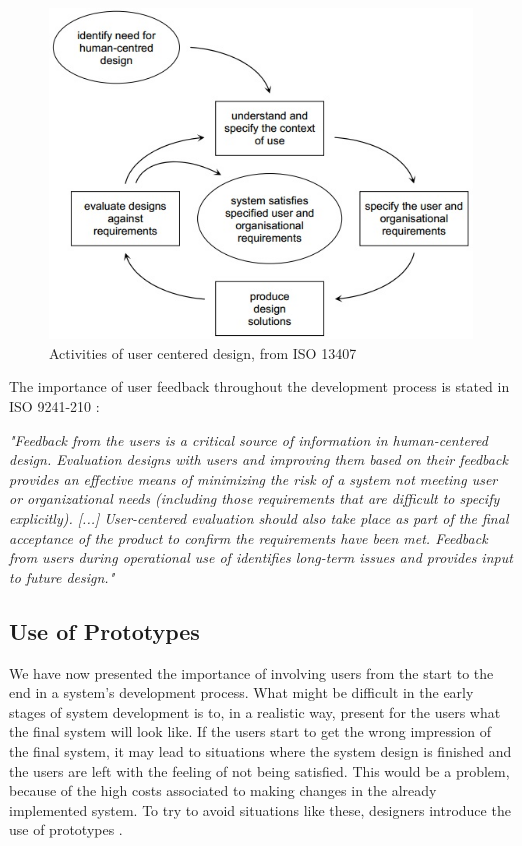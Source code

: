 \begin{figure} [H]
\centering
\includegraphics[scale=0.7]{userCenteredDesign.jpg}
\caption[User centered design]{Activities of user centered design, from ISO 13407 \cite{jokela2003standard}}
\label{userdesign}
\end{figure}

The importance of user feedback throughout the development process is stated in ISO 9241-210 \cite{dis20109241}:

\emph{"Feedback from the users is a critical source of information in human-centered design. Evaluation designs with users and improving them based on their feedback provides an effective means of minimizing the risk of a system not meeting user or organizational needs (including those requirements that are difficult to specify explicitly).  [...] User-centered evaluation should also take place as part of the final acceptance of the product to confirm the requirements have been met. Feedback from users during operational use of identifies long-term issues and provides input to future design."}

\subsection{Use of Prototypes}
\label{sec:prototypes}
We have now presented the importance of involving users from the start to the end in a system's development process. What might be difficult in the early stages of system development is to, in a realistic way, present for the users what the final system will look like. If the users start to get the wrong impression of the final system, it may lead to situations where the system design is finished and the users are left with the feeling of not being satisfied. This would be a problem, because of the high costs associated to making changes in the already implemented system. To try to avoid situations like these, designers introduce the use of prototypes \cite{mmi}. 

